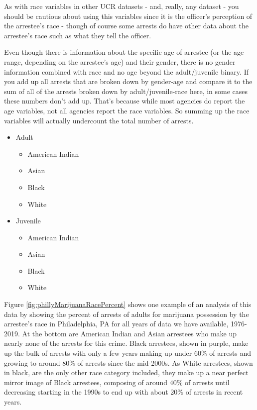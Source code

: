 \documentclass[
  12pt,
  openany]{book}
\providecommand{\tightlist}{%
  \setlength{\itemsep}{0pt}\setlength{\parskip}{0pt}}
\begin{document}
As with race variables in other UCR datasets - and, really, any dataset - you should be cautious about using this variables since it is the officer's perception of the arrestee's race - though of course some arrests do have other data about the arrestee's race such as what they tell the officer.

Even though there is information about the specific age of arrestee (or the age range, depending on the arrestee's age) and their gender, there is no gender information combined with race and no age beyond the adult/juvenile binary. If you add up all arrests that are broken down by gender-age and compare it to the sum of all of the arrests broken down by adult/juvenile-race here, in some cases these numbers don't add up. That's because while most agencies do report the age variables, not all agencies report the race variables. So summing up the race variables will actually undercount the total number of arrests.

\begin{itemize}
\tightlist
\item
  Adult

  \begin{itemize}
  \tightlist
  \item
    American Indian
  \item
    Asian
  \item
    Black
  \item
    White
  \end{itemize}
\item
  Juvenile

  \begin{itemize}
  \tightlist
  \item
    American Indian
  \item
    Asian
  \item
    Black
  \item
    White
  \end{itemize}
\end{itemize}

Figure \ref{fig:phillyMarijuanaRacePercent} shows one example of an analysis of this data by showing the percent of arrests of adults for marijuana possession by the arrestee's race in Philadelphia, PA for all years of data we have available, 1976-2019. At the bottom are American Indian and Asian arrestees who make up nearly none of the arrests for this crime. Black arrestees, shown in purple, make up the bulk of arrests with only a few years making up under 60\% of arrests and growing to around 80\% of arrests since the mid-2000s. As White arrestees, shown in black, are the only other race category included, they make up a near perfect mirror image of Black arrestees, composing of around 40\% of arrests until decreasing starting in the 1990s to end up with about 20\% of arrests in recent years.
\end{document}
